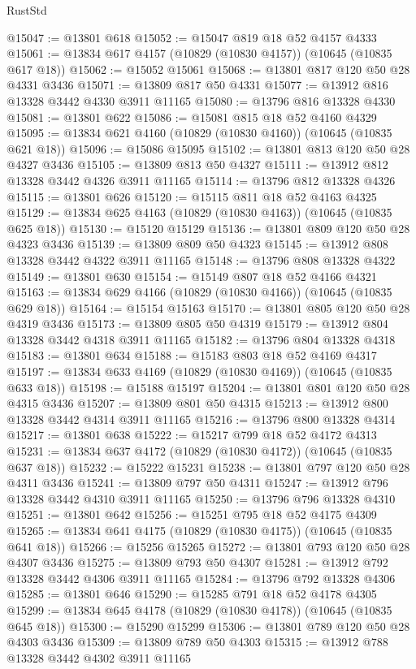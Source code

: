 \begin{lexlean}{RustStd}
\begin{coremodule}
@15047 := @13801 @618
@15052 := @15047 @819 @18 @52 @4157 @4333
@15061 := @13834 @617 @4157 (@10829 (@10830 @4157)) (@10645 (@10835 @617 @18))
@15062 := @15052 @15061
@15068 := @13801 @817 @120 @50 @28 @4331 @3436
@15071 := @13809 @817 @50 @4331
@15077 := @13912 @816 @13328 @3442 @4330 @3911 @11165
@15080 := @13796 @816 @13328 @4330
@15081 := @13801 @622
@15086 := @15081 @815 @18 @52 @4160 @4329
@15095 := @13834 @621 @4160 (@10829 (@10830 @4160)) (@10645 (@10835 @621 @18))
@15096 := @15086 @15095
@15102 := @13801 @813 @120 @50 @28 @4327 @3436
@15105 := @13809 @813 @50 @4327
@15111 := @13912 @812 @13328 @3442 @4326 @3911 @11165
@15114 := @13796 @812 @13328 @4326
@15115 := @13801 @626
@15120 := @15115 @811 @18 @52 @4163 @4325
@15129 := @13834 @625 @4163 (@10829 (@10830 @4163)) (@10645 (@10835 @625 @18))
@15130 := @15120 @15129
@15136 := @13801 @809 @120 @50 @28 @4323 @3436
@15139 := @13809 @809 @50 @4323
@15145 := @13912 @808 @13328 @3442 @4322 @3911 @11165
@15148 := @13796 @808 @13328 @4322
@15149 := @13801 @630
@15154 := @15149 @807 @18 @52 @4166 @4321
@15163 := @13834 @629 @4166 (@10829 (@10830 @4166)) (@10645 (@10835 @629 @18))
@15164 := @15154 @15163
@15170 := @13801 @805 @120 @50 @28 @4319 @3436
@15173 := @13809 @805 @50 @4319
@15179 := @13912 @804 @13328 @3442 @4318 @3911 @11165
@15182 := @13796 @804 @13328 @4318
@15183 := @13801 @634
@15188 := @15183 @803 @18 @52 @4169 @4317
@15197 := @13834 @633 @4169 (@10829 (@10830 @4169)) (@10645 (@10835 @633 @18))
@15198 := @15188 @15197
@15204 := @13801 @801 @120 @50 @28 @4315 @3436
@15207 := @13809 @801 @50 @4315
@15213 := @13912 @800 @13328 @3442 @4314 @3911 @11165
@15216 := @13796 @800 @13328 @4314
@15217 := @13801 @638
@15222 := @15217 @799 @18 @52 @4172 @4313
@15231 := @13834 @637 @4172 (@10829 (@10830 @4172)) (@10645 (@10835 @637 @18))
@15232 := @15222 @15231
@15238 := @13801 @797 @120 @50 @28 @4311 @3436
@15241 := @13809 @797 @50 @4311
@15247 := @13912 @796 @13328 @3442 @4310 @3911 @11165
@15250 := @13796 @796 @13328 @4310
@15251 := @13801 @642
@15256 := @15251 @795 @18 @52 @4175 @4309
@15265 := @13834 @641 @4175 (@10829 (@10830 @4175)) (@10645 (@10835 @641 @18))
@15266 := @15256 @15265
@15272 := @13801 @793 @120 @50 @28 @4307 @3436
@15275 := @13809 @793 @50 @4307
@15281 := @13912 @792 @13328 @3442 @4306 @3911 @11165
@15284 := @13796 @792 @13328 @4306
@15285 := @13801 @646
@15290 := @15285 @791 @18 @52 @4178 @4305
@15299 := @13834 @645 @4178 (@10829 (@10830 @4178)) (@10645 (@10835 @645 @18))
@15300 := @15290 @15299
@15306 := @13801 @789 @120 @50 @28 @4303 @3436
@15309 := @13809 @789 @50 @4303
@15315 := @13912 @788 @13328 @3442 @4302 @3911 @11165

\end{coremodule}
\end{lexlean}
